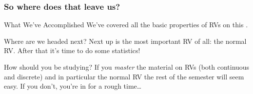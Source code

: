 \documentclass[handout]{beamer}
\begin{document}
\begin{frame}
  \frametitle{So where does that leave us?}

  \begin{block}{What We've Accomplished}
    We've covered all the basic properties of RVs on this \href{http://ditraglia.com/Econ103Public/RandomVariablesHandout.pdf}{\textcolor{blue}{}}.
  \end{block}

  \begin{block}{Where are we headed next?}
   Next up is the most important RV of all: the normal RV. 
   After that it's time to do some statistics!
  \end{block}

  \begin{alertblock}{How should you be studying?}
    If you \emph{master} the material on RVs (both continuous and discrete) and in particular the normal RV the rest of the semester will seem easy. 
    If you don't, you're in for a rough time\dots
  \end{alertblock}


\end{frame}
\end{document}
